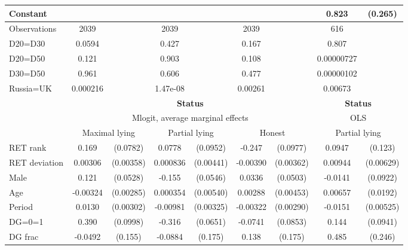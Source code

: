 \begin{tabular}{l|cccccc|cc}
Constant        &                  &         &                  &         &                  &         &    0.823\sym{***}&  (0.265)\\
\hline
Observations    &     2039         &         &     2039         &         &     2039         &         &      616         &         \\
D20=D30         &   0.0594         &         &    0.427         &         &    0.167         &         &    0.807         &         \\
D20=D50         &    0.121         &         &    0.903         &         &    0.108         &         &0.00000727         &         \\
D30=D50         &    0.961         &         &    0.606         &         &    0.477         &         &0.00000102         &         \\
Russia=UK       & 0.000216         &         & 1.47e-08         &         &  0.00261         &         &  0.00673         &         \\
\hline\hline
&\multicolumn{6}{c|}{\bf Status}&\multicolumn{2}{c}{\bf Status}\\ &\multicolumn{6}{c|}{Mlogit, average marginal effects }&\multicolumn{2}{c}{OLS}\\
                &\multicolumn{2}{c}{Maximal lying}&\multicolumn{2}{c}{Partial lying}&\multicolumn{2}{c}{Honest}  &\multicolumn{2}{c}{Partial lying}\\
\hline
RET rank        &    0.169\sym{**} & (0.0782)&   0.0778         & (0.0952)&   -0.247\sym{**} & (0.0977)&   0.0947         &  (0.123)\\
RET deviation   &  0.00306         &(0.00358)& 0.000836         &(0.00441)& -0.00390         &(0.00362)&  0.00944         &(0.00629)\\
Male            &    0.121\sym{**} & (0.0528)&   -0.155\sym{***}& (0.0546)&   0.0336         & (0.0503)&  -0.0141         & (0.0922)\\
Age             & -0.00324         &(0.00285)& 0.000354         &(0.00540)&  0.00288         &(0.00453)&  0.00657         & (0.0192)\\
Period          &   0.0130\sym{***}&(0.00302)& -0.00981\sym{***}&(0.00325)& -0.00322         &(0.00290)&  -0.0151\sym{***}&(0.00525)\\
DG=0=1          &    0.390\sym{***}& (0.0998)&   -0.316\sym{***}& (0.0651)&  -0.0741         & (0.0853)&    0.144         & (0.0941)\\
DG frac         &  -0.0492         &  (0.155)&  -0.0884         &  (0.175)&    0.138         &  (0.175)&    0.485\sym{*}  &  (0.246)\\

\end{tabular}
